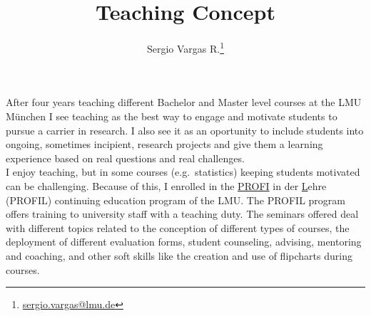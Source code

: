 \documentclass[a4paper,11pt]{article}
\makeatletter
\renewcommand{\maketitle}{\bgroup\setlength{\parindent}{0pt}
\begin{flushleft}
  \thispagestyle{plain}
  \textbf{\@title}

  \@author
\end{flushleft}\egroup
}
\renewenvironment{abstract}
 {\small
  \begin{flushleft}
  \textbf{\abstractname}\vspace{-0.40em}\vspace{0pt}
  \end{flushleft}
  \list{}{
    \setlength{\leftmargin}{0cm}%
    \setlength{\rightmargin}{\leftmargin}%
  }%
  \item\relax}
 {\endlist}
\makeatother
\begin{document}
\title{\Large Teaching Concept\newline}

\author[1]{Sergio Vargas R.\footnote[2]{\href{sergio.vargas@lmu.de}{sergio.vargas@lmu.de}}}


\date{}

\maketitle


After four years teaching different Bachelor and Master level courses at the LMU M\"unchen I see teaching as the best way to engage and motivate students to pursue a carrier in research. I also see it as an oportunity to include students into ongoing, sometimes incipient, research projects and give them a learning experience based on real questions and real challenges.\\

I enjoy teaching, but in some courses (e.g.~statistics) keeping students motivated can be challenging. Because of this, I enrolled in the \underline{PROFI} in der \underline{L}ehre (PROFIL) continuing education program of the LMU. The PROFIL program offers training to university staff with a teaching duty. The seminars offered deal with different topics related to the conception of different types of courses, the deployment of different evaluation forms, student counseling, advising, mentoring and coaching, and other soft skills like the creation and use of flipcharts during courses.\\
\end{document}
